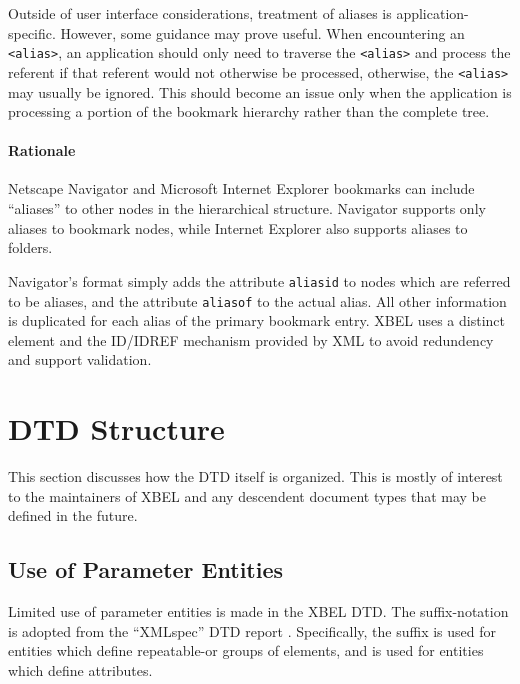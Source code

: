 \documentclass{howto}
\newcommand{\element}[1]{\texttt{<#1>}}
\newcommand{\attribute}[1]{\texttt{#1}}
\begin{document}
        Outside of user interface considerations, treatment of aliases 
        is application-specific.  However, some guidance may prove
        useful.  When encountering an \element{alias}, an application
        should only need to traverse the \element{alias} and process
        the referent if that referent would not otherwise be
        processed, otherwise, the \element{alias} may usually be
        ignored.  This should become an issue only when the
        application is processing a portion of the bookmark hierarchy
        rather than the complete tree.

      \paragraph*{Rationale}
        Netscape Navigator and Microsoft Internet Explorer bookmarks
        can include ``aliases'' to other nodes in the hierarchical
        structure.  Navigator supports only aliases to bookmark nodes,
        while Internet Explorer also supports aliases to folders.

        Navigator's format simply adds the attribute
        \attribute{aliasid} to nodes which are referred to be aliases,
        and the attribute \attribute{aliasof} to the actual alias.
        All other information is duplicated for each alias of the
        primary bookmark entry.  XBEL uses a distinct element and the
        ID/IDREF mechanism provided by XML to avoid redundency and
        support validation.


\section{DTD Structure
         \label{dtd-structure}}

  This section discusses how the DTD itself is organized.  This is
  mostly of interest to the maintainers of XBEL and any descendent
  document types that may be defined in the future.

  \subsection{Use of Parameter Entities
              \label{parameter-entities}}

    Limited use of parameter entities is made in the XBEL DTD.  The
    suffix-notation is adopted from the ``XMLspec'' DTD report
    \cite{w3c-xmlspec}.  Specifically, the  suffix is used
    for entities which define repeatable-or groups of elements, and
     is used for entities which define attributes.
\end{document}
